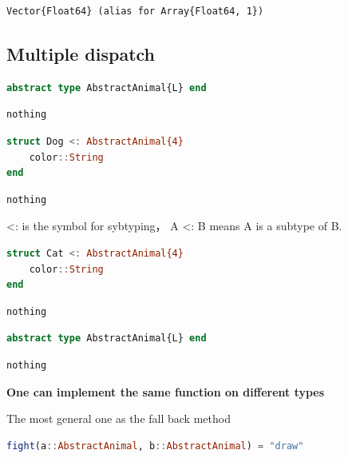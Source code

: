 \documentclass[
  notoc %
]{tufte-book}
\begin{document}
\begin{lstlisting}[language=Output]
Vector{Float64} (alias for Array{Float64, 1})
\end{lstlisting}

\hypertarget{multiple-dispatch}{%
\subsection{Multiple dispatch}\label{multiple-dispatch}}

\begin{lstlisting}[language=Julia]
abstract type AbstractAnimal{L} end
\end{lstlisting}

\begin{lstlisting}[language=Output]
nothing
\end{lstlisting}

\begin{lstlisting}[language=Julia]
struct Dog <: AbstractAnimal{4}
    color::String
end
\end{lstlisting}

\begin{lstlisting}[language=Output]
nothing
\end{lstlisting}

\textless: is the symbol for sybtyping， A \textless: B means A is a
subtype of B.

\begin{lstlisting}[language=Julia]
struct Cat <: AbstractAnimal{4}
    color::String
end
\end{lstlisting}

\begin{lstlisting}[language=Output]
nothing
\end{lstlisting}

\begin{lstlisting}[language=Julia]
abstract type AbstractAnimal{L} end
\end{lstlisting}

\begin{lstlisting}[language=Output]
nothing
\end{lstlisting}

\textbf{One can implement the same function on different types}

The most general one as the fall back method

\begin{lstlisting}[language=Julia]
fight(a::AbstractAnimal, b::AbstractAnimal) = "draw"
\end{lstlisting}
\end{document}
